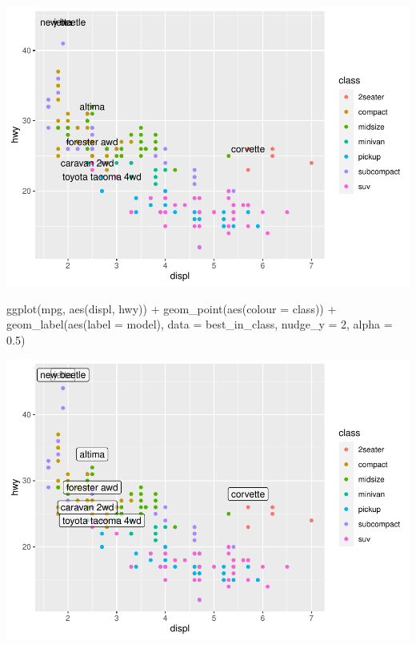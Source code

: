 \documentclass[
]{article}
\newenvironment{Shaded}{\begin{snugshade}}{\end{snugshade}}
\newcommand{\AttributeTok}[1]{\textcolor[rgb]{0.77,0.63,0.00}{#1}}
\newcommand{\DecValTok}[1]{\textcolor[rgb]{0.00,0.00,0.81}{#1}}
\newcommand{\FloatTok}[1]{\textcolor[rgb]{0.00,0.00,0.81}{#1}}
\newcommand{\FunctionTok}[1]{\textcolor[rgb]{0.00,0.00,0.00}{#1}}
\newcommand{\NormalTok}[1]{#1}
\newcommand{\SpecialCharTok}[1]{\textcolor[rgb]{0.00,0.00,0.00}{#1}}
\begin{document}
\includegraphics{Journal_files/figure-latex/unnamed-chunk-52-1.pdf}

\begin{Shaded}
\begin{Highlighting}[]
\FunctionTok{ggplot}\NormalTok{(mpg, }\FunctionTok{aes}\NormalTok{(displ, hwy)) }\SpecialCharTok{+}
  \FunctionTok{geom\_point}\NormalTok{(}\FunctionTok{aes}\NormalTok{(}\AttributeTok{colour =}\NormalTok{ class)) }\SpecialCharTok{+}
  \FunctionTok{geom\_label}\NormalTok{(}\FunctionTok{aes}\NormalTok{(}\AttributeTok{label =}\NormalTok{ model), }\AttributeTok{data =}\NormalTok{ best\_in\_class, }\AttributeTok{nudge\_y =} \DecValTok{2}\NormalTok{, }\AttributeTok{alpha =} \FloatTok{0.5}\NormalTok{)}
\end{Highlighting}
\end{Shaded}

\includegraphics{Journal_files/figure-latex/unnamed-chunk-52-2.pdf}
\end{document}
